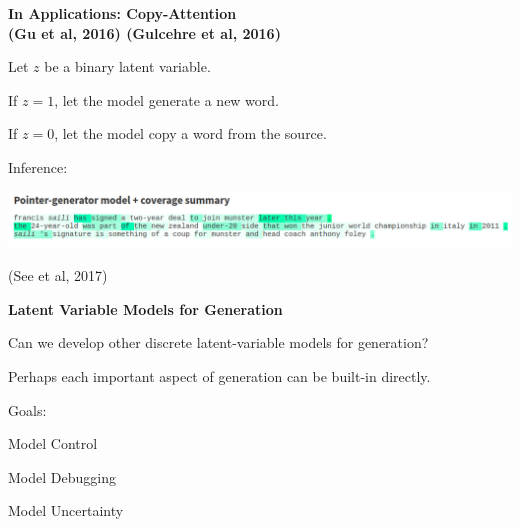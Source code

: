 \documentclass[aspectratio=169]{beamer}
\let\tempone\itemize
\let\temptwo\enditemize
\renewenvironment{itemize}{\tempone\addtolength{\itemsep}{0.5\baselineskip}}{\temptwo}
\newcommand{\air}{\vspace{0.25cm}}
\begin{document}
\begin{frame}
  \begin{center}
    \textbf{ In Applications: Copy-Attention \\
      \small{(Gu et al, 2016) (Gulcehre et al, 2016)}}
  \end{center}

Let $z$ be a binary latent variable.
\air
\begin{itemize}
\item If $z = 1$, let the model generate a new word.
\item If $z = 0$, let the model copy a word from the source.
\end{itemize}

Inference:
\begin{center}


\includegraphics[width=15cm]{seeblog}

\centerline{\small (See et al, 2017)}
\end{center}
\end{frame}


\begin{frame}
  \begin{center}
    \textbf{ Latent Variable Models for Generation}
  \end{center}

  \begin{itemize}
  \item Can we develop other discrete latent-variable models for generation?
    \air
  \item Perhaps each important aspect of generation can be built-in directly.
    \air
  \item Goals:
    \begin{itemize}
    \item Model Control
    \item Model Debugging
    \item Model Uncertainty
    \end{itemize}
  \end{itemize}
\end{frame}
\end{document}
